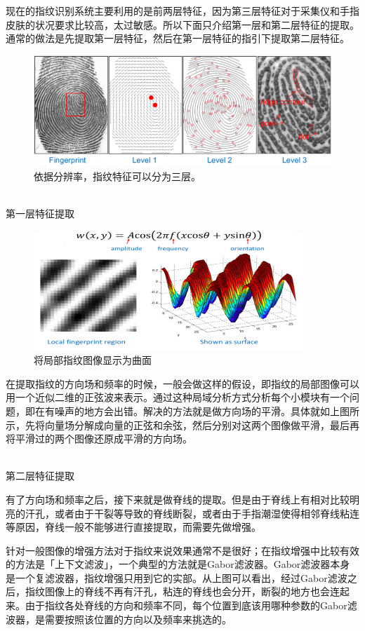\documentclass{article}
\begin{document}
	现在的指纹识别系统主要利用的是前两层特征，因为第三层特征对于采集仪和手指皮肤的状况要求比较高，太过敏感。所以下面只介绍第一层和第二层特征的提取。通常的做法是先提取第一层特征，然后在第一层特征的指引下提取第二层特征。\par 
	\begin{figure}[h!]
	\centering
	\includegraphics[scale=0.5]{cent.jpg}
	\caption{依据分辨率，指纹特征可以分为三层。}
	\label{fig3}
	\end{figure}
	~\\
	第一层特征提取\par
	\begin{figure}[h!]
	\centering
	\includegraphics[width=4in]{cosdoble.jpg}
	\caption{将局部指纹图像显示为曲面}
	\label{fig4}
	\end{figure}
	在提取指纹的方向场和频率的时候，一般会做这样的假设，即指纹的局部图像可以用一个近似二维的正弦波来表示。通过这种局域分析方式分析每个小模块有一个问题，即在有噪声的地方会出错。解决的方法就是做方向场的平滑。具体就如上图所示，先将向量场分解成向量的正弦和余弦，然后分别对这两个图像做平滑，最后再将平滑过的两个图像还原成平滑的方向场。\par ~\\
	第二层特征提取  ~\\ \par 
		有了方向场和频率之后，接下来就是做脊线的提取。但是由于脊线上有相对比较明亮的汗孔，或者由于干裂等导致的脊线断裂，或者由于手指潮湿使得相邻脊线粘连等原因，脊线一般不能够进行直接提取，而需要先做增强。\par


	针对一般图像的增强方法对于指纹来说效果通常不是很好；在指纹增强中比较有效的方法是「上下文滤波」，一个典型的方法就是Gabor滤波器。Gabor滤波器本身是一个复滤波器，指纹增强只用到它的实部。从上图可以看出，经过Gabor滤波之后，指纹图像上的脊线不再有汗孔，粘连的脊线也会分开，断裂的地方也会连起来。由于指纹各处脊线的方向和频率不同，每个位置到底该用哪种参数的Gabor滤波器，是需要按照该位置的方向以及频率来挑选的。\par
\end{document}
